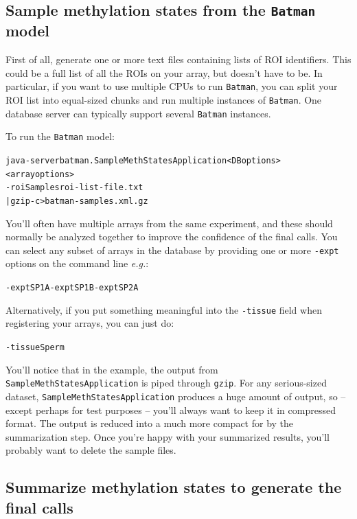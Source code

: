 \documentclass[a4paper, 11pt]{article}
\newcommand{\bm}{{\tt Batman}\xspace}
\begin{document}
\subsection{Sample methylation states from the \bm model}

First of all, generate one or more text files containing lists of ROI identifiers.
This could be a full list of all the ROIs on your array, but doesn't have to be.
In particular, if you want to use multiple CPUs to run \bm, you can split your ROI
list into equal-sized chunks and run multiple instances of \bm.  One database
server can typically support several \bm instances.

To run the \bm model:

\begin{alltt}java -server batman.SampleMethStatesApplication <DB options> 
           <array options> 
           -roiSamples roi-list-file.txt 
           | gzip -c >batman-samples.xml.gz\end{alltt}

You'll often have multiple arrays from the same experiment, and these should
normally be analyzed together to improve the confidence of the final calls.
You can select any subset of arrays in the database by providing
one or more {\tt -expt} options on the command line {\it e.g.}:

\begin{alltt}-expt SP1A -expt SP1B -expt SP2A\end{alltt}

Alternatively, if you put something meaningful into the {\tt -tissue}
field when registering your arrays, you can just do:

\begin{alltt}-tissue Sperm\end{alltt}

You'll notice that in the example, the output from {\tt SampleMethStatesApplication} is piped through {\tt gzip}.  For any
serious-sized dataset, {\tt SampleMethStatesApplication} produces a
huge amount of output, so -- except perhaps for test purposes --
you'll always want to keep it in compressed format.  The output is
reduced into a much more compact for by the summarization step.  Once
you're happy with your summarized results, you'll probably want to
delete the sample files.

\subsection{Summarize methylation states to generate the final calls}
\end{document}
